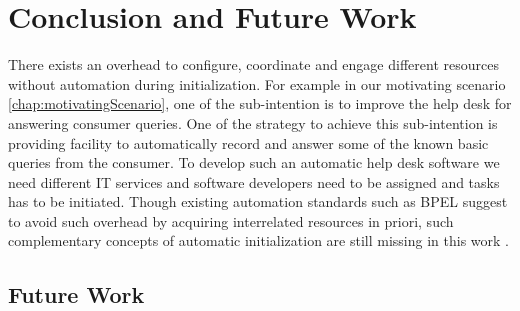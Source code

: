 \chapter{Conclusion and Future Work}
\label{chap:conclusion}

There exists an overhead to configure, coordinate and engage different resources without automation during initialization. For example in our motivating scenario \ref{chap:motivatingScenario}, one of the sub-intention is to improve the help desk for answering consumer queries. One of the strategy to achieve this sub-intention is providing facility to automatically record and answer some of the known basic queries from the consumer.  To develop such an automatic help desk software we need different IT services and software developers need to be assigned and tasks has to be initiated. Though existing automation standards such as BPEL suggest to avoid such overhead by acquiring interrelated resources in priori, such complementary concepts of automatic initialization are still missing in this work         \cite{Sungur2015}.




\section*{Future Work}
\label{sec:futurework}

